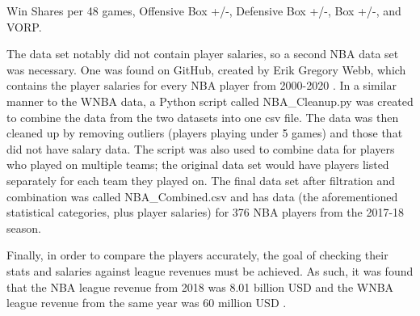 \documentclass[12pt]{article}
\begin{document}
Win Shares per 48 games, Offensive Box +/-, Defensive Box +/-, Box +/-, and VORP.
\newline
\par
The data set notably did not contain player salaries, so a second NBA data set was necessary. One was found on GitHub, 
created by Erik Gregory Webb, which contains the player salaries for every NBA player from 2000-2020 \cite{nba_salaries}. 
In a similar manner to the WNBA data, a Python script called NBA\_Cleanup.py was created to combine the data from the two 
datasets into one csv file. The data was then cleaned up by removing outliers (players playing under 5 games) and those 
that did not have salary data. The script was also used to combine data for players who played on multiple teams; 
the original data set would have players listed separately for each team they played on. The final data set after filtration 
and combination was called NBA\_Combined.csv and has data (the aforementioned statistical categories, plus player salaries) 
for 376 NBA players from the 2017-18 season.
\par
Finally, in order to compare the players accurately, the goal of checking their stats and salaries against league 
revenues must be achieved. As such, it was found that the NBA league revenue from 2018 was 8.01 billion USD \cite{NBA_Revenue} 
and the WNBA league revenue from the same year was 60 million USD \cite{WNBA_Revenue}.
\end{document}
